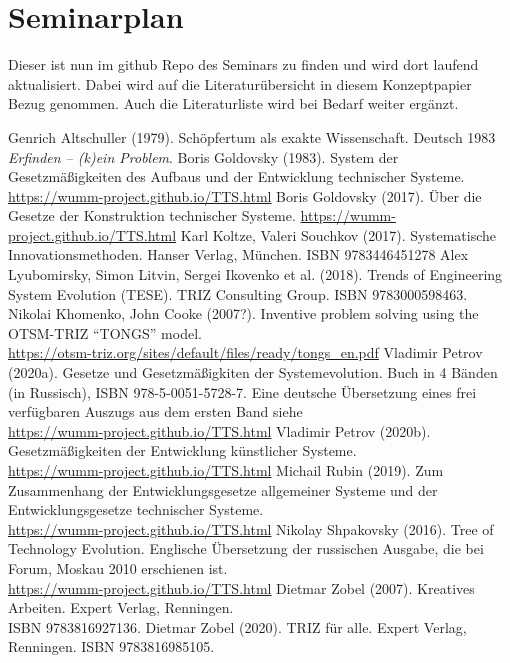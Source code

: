 \documentclass[11pt,a4paper]{article}
\begin{document}
\section{Seminarplan}

Dieser ist nun im github Repo des Seminars zu finden und wird dort laufend
aktualisiert.  Dabei wird auf die Literaturübersicht in diesem Konzeptpapier
Bezug genommen. Auch die Literaturliste wird bei Bedarf weiter ergänzt. 

\begin{thebibliography}{xxx}
 Genrich Altschuller (1979).  Schöpfertum als exakte
  Wissenschaft.  Deutsch 1983 \emph{Erfinden -- (k)ein Problem}.
 Boris Goldovsky (1983). System der Gesetzmäßigkeiten
  des Aufbaus und der Entwicklung technischer Systeme.
  \url{https://wumm-project.github.io/TTS.html}
 Boris Goldovsky (2017). Über die Gesetze der
  Konstruktion technischer Systeme.  
  \url{https://wumm-project.github.io/TTS.html}
 Karl Koltze, Valeri Souchkov (2017).
  Systematische Innovationsmethoden.  Hanser Verlag, München. ISBN
  9783446451278
 Alex Lyubomirsky, Simon Litvin, Sergei Ikovenko et al.
  (2018). Trends of Engineering System Evolution (TESE).  TRIZ Consulting
  Group. ISBN 9783000598463.
 Nikolai Khomenko, John Cooke (2007?).  Inventive
  problem solving using the OTSM-TRIZ “TONGS” model. \\
  \url{https://otsm-triz.org/sites/default/files/ready/tongs_en.pdf}
 Vladimir Petrov (2020a). Gesetze und Gesetzmäßigkiten
  der Systemevolution. Buch in 4 Bänden (in Russisch), ISBN
  978-5-0051-5728-7.  Eine deutsche Übersetzung eines frei verfügbaren Auszugs
  aus dem ersten Band siehe \\
  \url{https://wumm-project.github.io/TTS.html}
 Vladimir Petrov (2020b). Gesetzmäßigkeiten der
  Entwicklung künstlicher Systeme. \\
  \url{https://wumm-project.github.io/TTS.html} 
 Michail Rubin (2019). Zum Zusammenhang der
  Entwicklungsgesetze allgemeiner Systeme und der Entwicklungsgesetze
  technischer Systeme. \\ \url{https://wumm-project.github.io/TTS.html}
 Nikolay Shpakovsky (2016). Tree of Technology
  Evolution. Englische Übersetzung der russischen Ausgabe, die bei Forum,
  Moskau 2010 erschienen ist.\\ \url{https://wumm-project.github.io/TTS.html}
 Dietmar Zobel (2007). Kreatives Arbeiten. Expert Verlag,
  Renningen.\\ ISBN 9783816927136.
 Dietmar Zobel (2020). TRIZ für alle. Expert Verlag,
  Renningen. ISBN 9783816985105.
\end{thebibliography}
\end{document}
